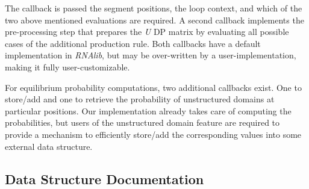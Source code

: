 The callback is passed the segment positions, the loop context, and which of the two above mentioned evaluations are required. A second callback implements the pre-\/processing step that prepares the {\itshape U} DP matrix by evaluating all possible cases of the additional production rule. Both callbacks have a default implementation in {\itshape R\+N\+Alib}, but may be over-\/written by a user-\/implementation, making it fully user-\/customizable.

For equilibrium probability computations, two additional callbacks exist. One to store/add and one to retrieve the probability of unstructured domains at particular positions. Our implementation already takes care of computing the probabilities, but users of the unstructured domain feature are required to provide a mechanism to efficiently store/add the corresponding values into some external data structure. 

\subsection{Data Structure Documentation}
\label{structvrna__unstructured__domain__s}
\hypertarget{group__domains__up_structvrna__unstructured__domain__s}{}
